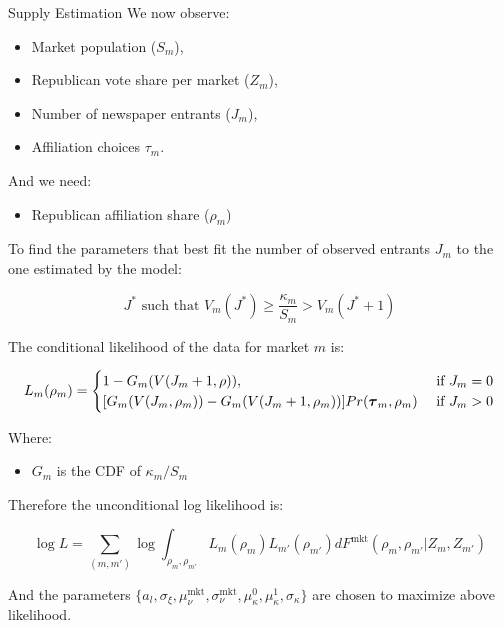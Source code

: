 \documentclass{beamer}
\begin{document}
\begin{frame}[t]{Supply Estimation}
  We now observe:
  \begin{itemize}
    \item Market population ($S_m$),
    \item Republican vote share per market ($Z_m$),
    \item Number of newspaper entrants ($J_m$),
    \item Affiliation choices $\tau_m$.
  \end{itemize}

  And we need:
  \begin{itemize}
    \item Republican affiliation share ($\rho_m$)
  \end{itemize}

  To find the parameters that best fit the number of observed entrants $J_m$ to
  the one estimated by the model:

    \[ J^* \text{ such that } V_m(J^*) \ge \frac{\kappa_m}{S_m} > V_m(J^* + 1) \]

\end{frame}
  
\begin{frame}
  The conditional likelihood of the data for market $m$ is:

  \small\[
    L_m(\rho_m) = \begin{cases}
      1 - G_m(V(J_m + 1, \rho)), &\text{ if }J_m = 0 \\
      [G_m(V(J_m,\rho_m)) - G_m(V(J_m + 1,\rho_m))]
      Pr(\text{\boldmath$\tau$}_m, \rho_m) &\text{ if } J_m > 0
    \end{cases}
  \]

  Where:
  \begin{itemize}
    \item $G_m$ is the CDF of $\kappa_m/S_m$
  \end{itemize}

  Therefore the unconditional log likelihood is:

  \[
    \log L = \sum_{(m, m')} \log\int_{\rho_m, \rho_{m'}} L_m(\rho_m)L_{m'}(\rho_{m'})
    dF^{\text{mkt}}(\rho_m, \rho_{m'} | Z_m, Z_{m'})
  \]

  And the parameters $\{a_l, \sigma_\xi, \mu^{\text{mkt}}_\nu, \sigma^{\text{mkt}}_\nu,
  \mu^0_\kappa, \mu^1_\kappa, \sigma_\kappa\}$ are chosen to maximize above likelihood.
\end{frame}
\end{document}
